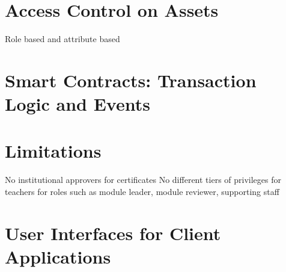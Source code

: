 \section{Access Control on Assets}
Role based and attribute based

\section{Smart Contracts: Transaction Logic and Events}

\section{Limitations}
No institutional approvers for certificates
No different tiers of privileges for teachers for roles such as module leader, module reviewer, supporting staff

\section{User Interfaces for Client Applications}
